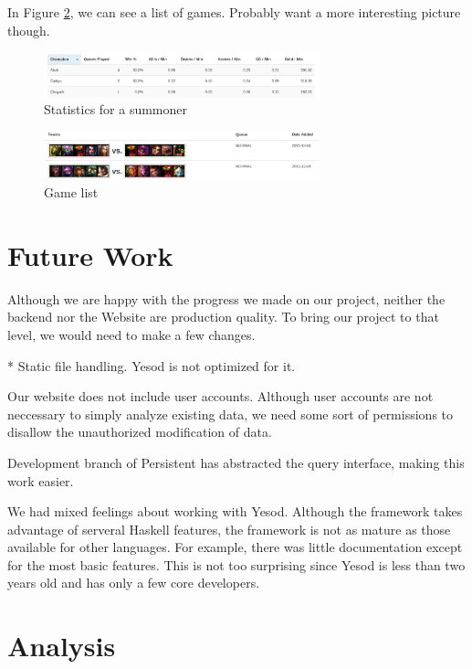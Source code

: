 \documentclass{chi2009}
\begin{document}
In Figure \ref{list}, we can see a list of games. Probably want a more interesting picture though.

\begin{figure}[h]
    \includegraphics[width=80mm]{imgs/stats.png}
    \caption{Statistics for a summoner}
    \label{chart}
\end{figure}

\begin{figure}[h]
    \includegraphics[width=80mm]{imgs/gamelist.png}
    \caption{Game list}
    \label{list}
\end{figure}

\section{Future Work}
\label{future}

Although we are happy with the progress we made on our project, neither the backend nor the Website are production quality. To bring our project to that level, we would need to make a few changes. 

* Static file handling.  Yesod is not optimized for it.

Our website does not include user accounts. Although user accounts are not neccessary to simply analyze existing data, we need some sort of permissions to disallow the unauthorized modification of data.

Development branch of Persistent has abstracted the query interface, making this work easier.

We had mixed feelings about working with Yesod. Although the framework takes advantage of serveral Haskell features, the framework is not as mature as those available for other languages. For example, there was little documentation except for the most basic features. This is not too surprising since Yesod is less than two years old and has only a few core developers. 

\section{Analysis}
\label{analysis}
\end{document}
